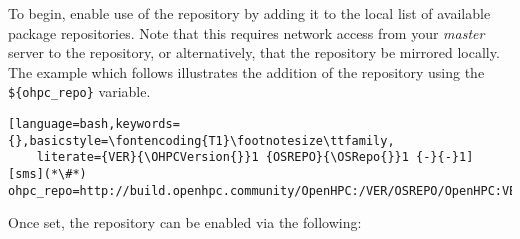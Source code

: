 To begin, enable use of the \OHPC{} repository by adding it to the local list
of available package repositories.  Note that this requires network access from
your {\em master} server to the \OHPC{} repository, or alternatively, that
the \OHPC{} repository be mirrored locally. The example which follows
illustrates the addition of the \OHPC{} repository using
the \texttt{\$\{ohpc\_repo\}} variable.

\begin{lstlisting}[language=bash,keywords={},basicstyle=\fontencoding{T1}\footnotesize\ttfamily,
	literate={VER}{\OHPCVersion{}}1 {OSREPO}{\OSRepo{}}1 {-}{-}1]
[sms](*\#*) ohpc_repo=http://build.openhpc.community/OpenHPC:/VER/OSREPO/OpenHPC:VER.repo
\end{lstlisting}

\noindent Once set, the repository can be enabled via the following: 







